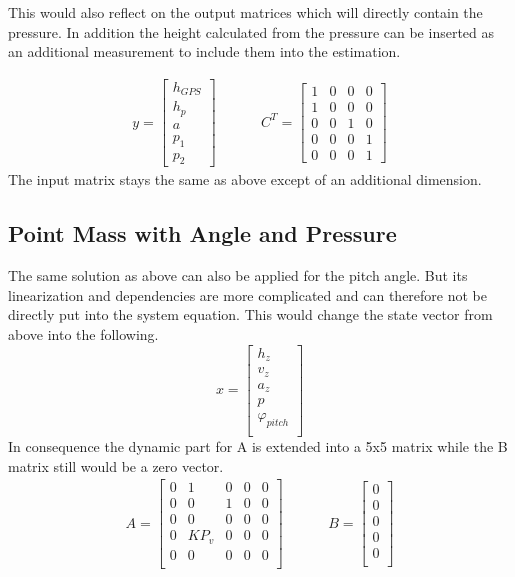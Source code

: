   This would also reflect on the output matrices which will directly contain the pressure.
  In addition the height calculated from the pressure can be inserted as an additional measurement to include them into the estimation.

  \begin{align*}
   y = \begin{bmatrix}
        h_{GPS}	\\
        h_{p}	\\
        a	\\
        p_1	\\
        p_2
       \end{bmatrix}
       & \hspace{1cm}
  C^T = \begin{bmatrix}
       1 & 0 & 0 & 0 \\
       1 & 0 & 0 & 0 \\
       0 & 0 & 1 & 0 \\
       0 & 0 & 0 & 1 \\
       0 & 0 & 0 & 1
      \end{bmatrix}
  \end{align*}
  The input matrix stays the same as above except of an additional dimension.

  \subsection{Point Mass with Angle and Pressure}
  The same solution as above can also be applied for the pitch angle.
  But its linearization and dependencies are more complicated and can therefore not be directly put into the system equation.
  This would change the state vector from above into the following.
  $$ x = \begin{bmatrix}
  h_z\\
  v_z\\
  a_z\\
  p\\
  \varphi_{pitch}\\
  \end{bmatrix} $$
  In consequence the dynamic part for A is extended into a 5x5 matrix while the B matrix still would be a zero vector.
  \begin{align*}
  A= \begin{bmatrix}
        0 & 1 & 0 & 0 & 0 \\
        0 & 0 & 1 & 0 & 0 \\
        0 & 0 & 0 & 0 & 0 \\
        0 & KP_v & 0 & 0 & 0 \\
        0 & 0 & 0 & 0 & 0 \\
        \end{bmatrix}
  & \hspace{1cm}
  B = \begin{bmatrix}
             0 \\
             0 \\
             0 \\
             0 \\
             0 \\
        \end{bmatrix}
  \end{align*}

